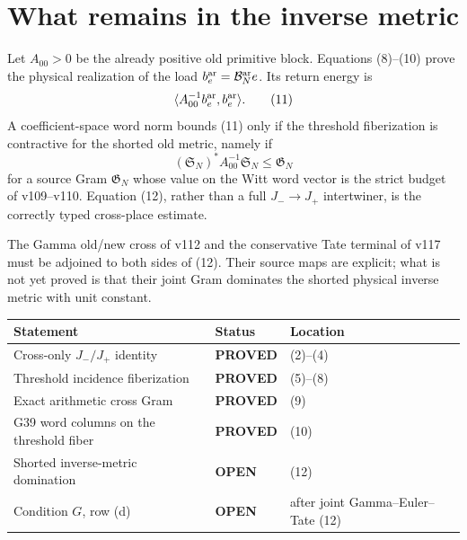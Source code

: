 \documentclass[11pt]{article}
\newcommand{\PROVED}{\textcolor{green!40!black}{\textbf{PROVED}}}
\newcommand{\OPEN}{\textcolor{red!70!black}{\textbf{OPEN}}}
\begin{document}
\section{What remains in the inverse metric}

Let $A_{00}>0$ be the already positive old primitive block.  Equations
(8)--(10) prove the physical realization of the load
$b_e^{\rm ar}=\mathcal B_N^{\rm ar}e$.  Its return energy is
\begin{equation}
 \langle A_{00}^{-1}b_e^{\rm ar},b_e^{\rm ar}\rangle.        \tag{11}
\end{equation}
A coefficient-space word norm bounds (11) only if the threshold
fiberization is contractive for the shorted old metric, namely if
\begin{equation}
 (\mathfrak S_N)^*A_{00}^{-1}\mathfrak S_N
 \le \mathfrak G_N                                          \tag{12}
\end{equation}
for a source Gram $\mathfrak G_N$ whose value on the Witt word vector is
the strict budget of v109--v110.  Equation (12), rather than a full
$J_-\to J_+$ intertwiner, is the correctly typed cross-place estimate.

The Gamma old/new cross of v112 and the conservative Tate terminal of v117
must be adjoined to both sides of (12).  Their source maps are explicit;
what is not yet proved is that their joint Gram dominates the shorted
physical inverse metric with unit constant.

\begin{center}
\begin{tabular}{>{\raggedright\arraybackslash}p{.55\linewidth}
                >{\centering\arraybackslash}p{.15\linewidth}
                >{\raggedright\arraybackslash}p{.20\linewidth}}
\toprule
Statement & Status & Location \\
\midrule
Cross-only $J_-/J_+$ identity & \PROVED & (2)--(4) \\
Threshold incidence fiberization & \PROVED & (5)--(8) \\
Exact arithmetic cross Gram & \PROVED & (9) \\
G39 word columns on the threshold fiber & \PROVED & (10) \\
Shorted inverse-metric domination & \OPEN & (12) \\
Condition $G$, row (d) & \OPEN & after joint Gamma--Euler--Tate (12) \\
\bottomrule
\end{tabular}
\end{center}
\end{document}
